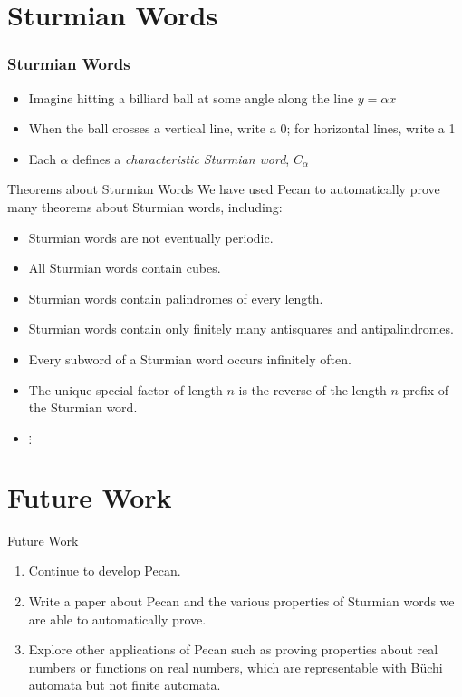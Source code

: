 \documentclass[leqno,presentation,usenames,dvipsnames]{beamer}
\begin{document}
\section{Sturmian Words}

\begin{frame}
    \frametitle{Sturmian Words}

    \begin{itemize}
        \item Imagine hitting a billiard ball at some angle along the line $y = \alpha x$
        \item When the ball crosses a vertical line, write a 0; for horizontal lines, write a 1
        \item Each $\alpha$ defines a \emph{characteristic Sturmian word}, $C_{\alpha}$
    \end{itemize}
\end{frame}

\begin{frame}{Theorems about Sturmian Words}
    We have used Pecan to automatically prove many theorems about Sturmian words, including:
    \begin{itemize}
        \item Sturmian words are not eventually periodic.
        \item All Sturmian words contain cubes.
        \item Sturmian words contain palindromes of every length.
        \item Sturmian words contain only finitely many antisquares and antipalindromes.
        \item Every subword of a Sturmian word occurs infinitely often.
        \item The unique special factor of length $n$ is the reverse of the length $n$ prefix of the Sturmian word.
        \item $\vdots$
    \end{itemize}
\end{frame}

\section{Future Work}
\begin{frame}{Future Work}
    \begin{enumerate}
        \item Continue to develop Pecan.
        \item Write a paper about Pecan and the various properties of Sturmian words we are able to automatically prove.
        \item Explore other applications of Pecan such as proving properties about real numbers or functions on real numbers, which are representable with B\"uchi automata but not finite automata.
    \end{enumerate}
\end{frame}
\end{document}
